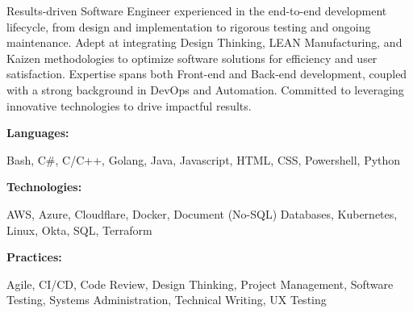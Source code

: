 \documentclass[9pt]{developercv} %
\begin{document}
\begin{minipage}[t]{0.46\textwidth}
	\vspace{-6pt}
 
Results-driven Software Engineer experienced in the end-to-end development lifecycle, from design and implementation to rigorous testing and ongoing maintenance. Adept at integrating Design Thinking, LEAN Manufacturing, and Kaizen methodologies to optimize software solutions for efficiency and user satisfaction. Expertise spans both Front-end and Back-end development, coupled with a strong background in DevOps and Automation. Committed to leveraging innovative technologies to drive impactful results.
\\
\end{minipage}
\hfill %
\begin{minipage}[t]{0.465\textwidth}
    \vspace{-6pt}
    
    \begin{minipage}[t]{0.2\textwidth}
        \textbf{Languages:}
    \end{minipage}
    \hfill
    \begin{minipage}[t]{0.73\textwidth}
      Bash, C\#, C/C++, Golang, Java, Javascript, HTML, CSS, Powershell, Python
    \end{minipage}
    \vspace{2mm}
    
    \begin{minipage}[t]{0.2\textwidth}
        \textbf{Technologies:}
    \end{minipage}
    \hfill
    \begin{minipage}[t]{0.73\textwidth}
AWS, Azure, Cloudflare, Docker, Document (No-SQL) Databases, Kubernetes, Linux, Okta, SQL, Terraform
    \end{minipage}
    
    \vspace{2mm}
    
    \begin{minipage}[t]{0.2\textwidth}
        \textbf{Practices:}
    \end{minipage}
    \hfill
    \begin{minipage}[t]{0.73\textwidth}
Agile, CI/CD, Code Review, Design Thinking, Project Management, Software Testing, Systems Administration, Technical Writing, UX Testing
    \end{minipage}
    \vspace{4mm}
\end{minipage}
\end{document}
